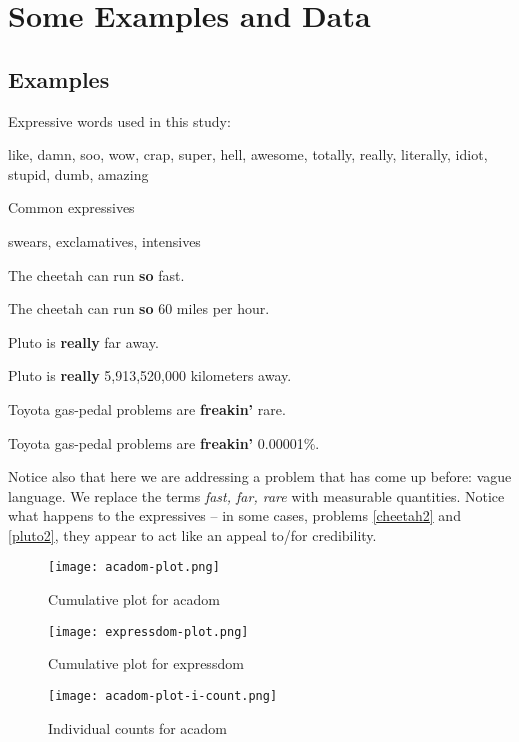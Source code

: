 \documentclass{article}
\begin{document}
\section{Some Examples and Data}
\subsection{Examples}
\begin{exe}
\ex Expressive words used in this study:
\begin{xlist}
\ex like, damn, soo, wow, crap, super, hell, awesome, totally, really, literally, idiot, stupid, dumb, amazing\label{exp}
\end{xlist}
\ex Common expressives
\begin{xlist}
\ex swears, exclamatives, intensives
\end{xlist}
\ex The cheetah can run {\bf so} fast.
\begin{xlist}
\ex The cheetah can run {\bf so} 60 miles per hour.\label{cheetah2}
\end{xlist}
\ex Pluto is {\bf really} far away.
\begin{xlist}
\ex Pluto is {\bf really} 5,913,520,000 kilometers away.\label{pluto2} 
\end{xlist}
\ex Toyota gas-pedal problems are {\bf freakin'} rare.
\begin{xlist}
\ex Toyota gas-pedal problems are {\bf freakin'} 0.00001\%. 
\end{xlist}
\end{exe}

Notice also that here we are addressing a problem that has come up before: vague language. We replace the terms \textsl{fast, far, rare} with measurable quantities. Notice what happens to the expressives -- in some cases, problems \ref{cheetah2} and \ref{pluto2}, they appear to act like an appeal to/for credibility.

\begin{figure}
\texttt{[image: acadom-plot.png]}
\caption{Cumulative plot for acadom}
\end{figure}

\begin{figure}
\texttt{[image: expressdom-plot.png]}
\caption{Cumulative plot for expressdom}
\end{figure}

\begin{figure}
\texttt{[image: acadom-plot-i-count.png]}
\caption{Individual counts for acadom}
\end{figure}
\end{document}
